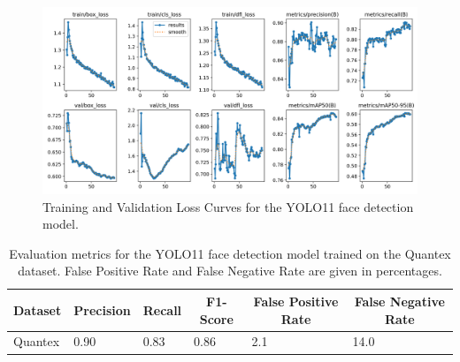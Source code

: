 \documentclass[
  man,floatsintext]{apa6}
\begin{document}
\begin{figure}

{\centering \includegraphics[width=450px]{images/yolo_face_loss_curves} 

}

\caption{Training and Validation Loss Curves for the YOLO11 face detection model.}\label{fig:face-loss-curves}
\end{figure}

\begin{table}[tbp]

\begin{center}
\begin{threeparttable}

\caption{\label{tab:face-detection-metrics-detailed}Evaluation metrics for the YOLO11 face detection model trained on the Quantex dataset. False Positive Rate and False Negative Rate are given in percentages.}

\begin{tabular}{llllll}
\toprule
Dataset & \multicolumn{1}{c}{Precision} & \multicolumn{1}{c}{Recall} & \multicolumn{1}{c}{F1-Score} & \multicolumn{1}{c}{False Positive Rate} & \multicolumn{1}{c}{False Negative Rate}\\
\midrule
Quantex & 0.90 & 0.83 & 0.86 & 2.1 & 14.0\\
\bottomrule
\end{tabular}

\end{threeparttable}
\end{center}

\end{table}
\end{document}
